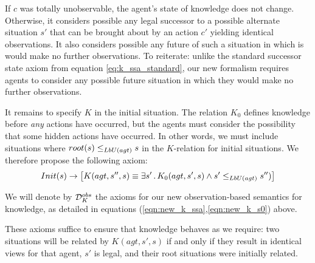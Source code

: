 If $c$ was totally unobservable, the agent's state of knowledge does
not change. Otherwise, it considers possible any legal successor to
a possible alternate situation $s'$ that can be brought about by
an action $c'$ yielding identical observations. It also considers
possible any future of such a situation in which is would make no
further observations. To reiterate: unlike the standard successor
state axiom from equation \eqref{eq:k_ssa_standard}, our new formalism
requires agents to consider any possible future situation in which
they would make no further observations.

It remains to specify $K$ in the initial situation. The relation
$K_{0}$ defines knowledge before \emph{any} actions have occurred,
but the agents must consider the possibility that some hidden actions
have occurred. In other words, we must include situations where $root(s)\leq_{LbU(agt)}s$
in the $K$-relation for initial situations. We therefore propose
the following axiom:\begin{gather}
Init(s)\rightarrow\left[K(agt,s'',s)\equiv\exists s'\,.\, K_{0}(agt,s',s)\wedge s'\leq_{LbU(agt)}s'')\right]\label{eqn:new_k_s0}\end{gather}


\begin{defn}
We will denote by $\mathcal{D}_{K}^{obs}$ the axioms for our new observation-based
semantics for knowledge, as detailed in equations (\ref{eqn:new_k_ssa},\ref{eqn:new_k_s0})
above. 
\end{defn}
These axioms suffice to ensure that knowledge behaves as we require:
two situations will be related by $K(agt,s',s)$ if and only if they
result in identical views for that agent, $s'$ is legal, and their
root situations were initially related.


